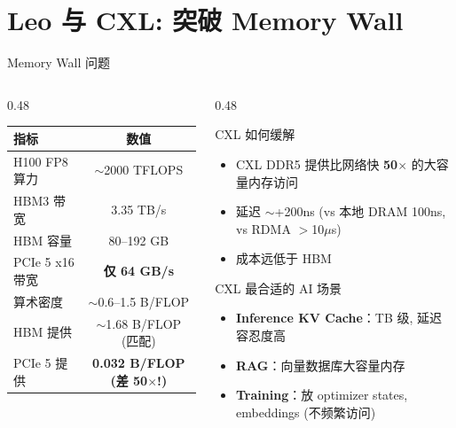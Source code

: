 \documentclass[aspectratio=169, 10pt, UTF8]{ctexbeamer}
\begin{document}
\section{Leo 与 CXL: 突破 Memory Wall}

\begin{frame}{Memory Wall 问题}
  \begin{columns}[T]
    \begin{column}{0.48\textwidth}
      \begin{table}[h]
        \centering
        \footnotesize
        \begin{tabular}{lc}
          \toprule
          \textbf{指标} & \textbf{数值} \\
          \midrule
          H100 FP8 算力 & $\sim$2000 TFLOPS \\
          HBM3 带宽 & 3.35 TB/s \\
          HBM 容量 & 80–192 GB \\
          PCIe 5 x16 带宽 & \textbf{仅 64 GB/s} \\
          \midrule
          算术密度 & $\sim$0.6–1.5 B/FLOP \\
          HBM 提供 & $\sim$1.68 B/FLOP (匹配) \\
          PCIe 5 提供 & \textbf{0.032 B/FLOP (差 50$\times$!)} \\
          \bottomrule
        \end{tabular}
      \end{table}
    \end{column}
    \begin{column}{0.48\textwidth}
      \begin{block}{CXL 如何缓解}
        \begin{itemize}
          \item CXL DDR5 提供比网络快 \textbf{50$\times$} 的大容量内存访问
          \item 延迟 $\sim$+200ns (vs 本地 DRAM 100ns, vs RDMA $>$10$\mu$s)
          \item 成本远低于 HBM
        \end{itemize}
      \end{block}

      \begin{exampleblock}{CXL 最合适的 AI 场景}
        \begin{itemize}
          \item \textbf{Inference KV Cache}：TB 级, 延迟容忍度高
          \item \textbf{RAG}：向量数据库大容量内存
          \item \textbf{Training}：放 optimizer states, embeddings (不频繁访问)
        \end{itemize}
      \end{exampleblock}
    \end{column}
  \end{columns}
\end{frame}
\end{document}
